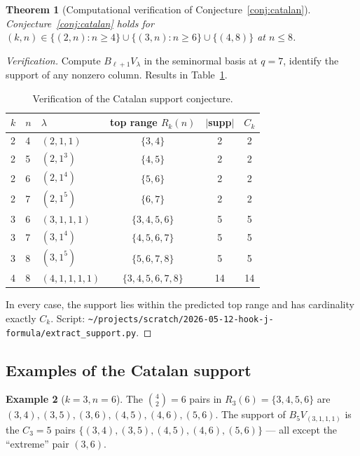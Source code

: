 \documentclass[11pt]{article}
\newtheorem{theorem}{Theorem}
\theoremstyle{definition}
\newtheorem{example}[theorem]{Example}
\begin{document}
\begin{theorem}[Computational verification of Conjecture~\ref{conj:catalan}]
\label{thm:catalan-verify}
Conjecture~\ref{conj:catalan} holds for $(k,n)\in\{(2,n) : n\ge 4\}\cup
\{(3,n) : n\ge 6\}\cup\{(4,8)\}$ at $n\le 8$.
\end{theorem}

\begin{proof}[Verification]
Compute $B_{\ell+1}V_\lambda$ in the seminormal basis at $q=7$,
identify the support of any nonzero column.  Results in
Table~\ref{tab:catalan}.

\begin{center}
\begin{table}[h]
\centering
\renewcommand{\arraystretch}{1.05}
\begin{tabular}{l l l c c c}
\toprule
$k$ & $n$ & $\lambda$ & top range $R_k(n)$ & $|$supp$|$ & $C_k$ \\
\midrule
2 & 4 & $(2,1,1)$            & $\{3,4\}$         & 2 & 2 \\
2 & 5 & $(2,1^3)$            & $\{4,5\}$         & 2 & 2 \\
2 & 6 & $(2,1^4)$            & $\{5,6\}$         & 2 & 2 \\
2 & 7 & $(2,1^5)$            & $\{6,7\}$         & 2 & 2 \\
3 & 6 & $(3,1,1,1)$          & $\{3,4,5,6\}$     & 5 & 5 \\
3 & 7 & $(3,1^4)$            & $\{4,5,6,7\}$     & 5 & 5 \\
3 & 8 & $(3,1^5)$            & $\{5,6,7,8\}$     & 5 & 5 \\
4 & 8 & $(4,1,1,1,1)$        & $\{3,4,5,6,7,8\}$ & 14 & 14 \\
\bottomrule
\end{tabular}
\caption{Verification of the Catalan support conjecture.}
\label{tab:catalan}
\end{table}
\end{center}

In every case, the support lies within the predicted top range and has
cardinality exactly $C_k$.  Script:
\texttt{\textasciitilde/projects/scratch/2026-05-12-hook-j-formula/extract\_support.py}.
\end{proof}

\subsection{Examples of the Catalan support}

\begin{example}[$k=3,n=6$]
The $\binom{4}{2}=6$ pairs in $R_3(6)=\{3,4,5,6\}$ are
$(3,4),(3,5),(3,6),(4,5),(4,6),(5,6)$.  The support of $B_5V_{(3,1,1,1)}$
is the $C_3=5$ pairs $\{(3,4),(3,5),(4,5),(4,6),(5,6)\}$ ---
all except the ``extreme'' pair $(3,6)$.
\end{example}
\end{document}
